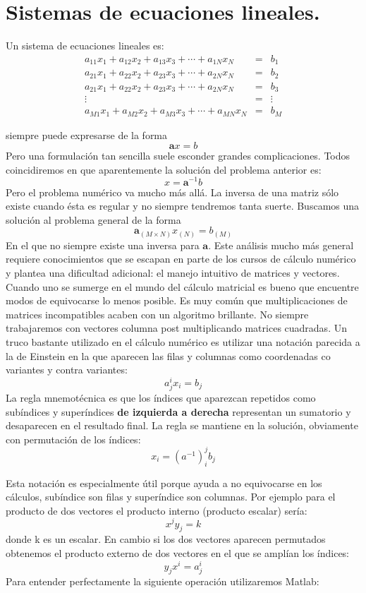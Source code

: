 \section{Sistemas de ecuaciones lineales.}

Un sistema de ecuaciones lineales es: 
\begin{eqnarray*}
a_{11}x_{1}+a_{12}x_{2}+a_{13}x_{3}+\cdots+a_{1N}x_{N} & = & b_{1}\\
a_{21}x_{1}+a_{22}x_{2}+a_{23}x_{3}+\cdots+a_{2N}x_{N} & = & b_{2}\\
a_{21}x_{1}+a_{22}x_{2}+a_{23}x_{3}+\cdots+a_{2N}x_{N} & = & b_{3}\\
\vdots & = & \vdots\\
a_{M1}x_{1}+a_{M2}x_{2}+a_{M3}x_{3}+\cdots+a_{MN}x_{N} & = & b_{M}
\end{eqnarray*}

siempre puede expresarse de la forma
$$\mathbf{a}x=b$$
 Pero una formulación tan sencilla suele esconder grandes complicaciones.
Todos coincidiremos en que aparentemente la solución del problema
anterior es:
$$x=\mathbf{a}^{-1}b$$
Pero el problema numérico va mucho más allá. La inversa de una matriz
sólo existe cuando ésta es regular y no siempre tendremos tanta suerte.
Buscamos una solución al problema general de la forma
$$\mathbf{a}_{(M\times N)}x_{(N)}=b_{(M)}$$
En el que no siempre existe una inversa para $\mathbf{a}$. Este análisis
mucho más general requiere conocimientos que se escapan en parte de
los cursos de cálculo numérico y plantea una dificultad adicional:
el manejo intuitivo de matrices y vectores. Cuando uno se sumerge
en el mundo del cálculo matricial es bueno que encuentre modos de
equivocarse lo menos posible. Es muy común que multiplicaciones de
matrices incompatibles acaben con un algoritmo brillante. No siempre
trabajaremos con vectores columna post multiplicando matrices cuadradas.
Un truco bastante utilizado en el cálculo numérico es utilizar una
notación parecida a la de Einstein en la que aparecen las filas y
columnas como coordenadas co variantes y contra variantes:
$$a_{j}^{i}x_{i}=b_{j}$$
La regla mnemotécnica es que los índices que aparezcan repetidos como
subíndices y superíndices \textbf{de izquierda a derecha} representan
un sumatorio y desaparecen en el resultado final. La regla se mantiene
en la solución, obviamente con permutación de los índices:
$$x_{i}=(a^{-1})_{i}^{j}b_{j}$$


Esta notación es especialmente útil porque ayuda a no equivocarse
en los cálculos, subíndice son filas y superíndice son columnas. Por
ejemplo para el producto de dos vectores el producto interno (producto
escalar) sería:
$$x^{j}y_{j}=k$$
donde k es un escalar. En cambio si los dos vectores aparecen permutados
obtenemos el producto externo de dos vectores en el que se amplían
los índices:
$$y_{j}x^{i}=a_{j}^{i}$$
Para entender perfectamente la siguiente operación utilizaremos Matlab:

